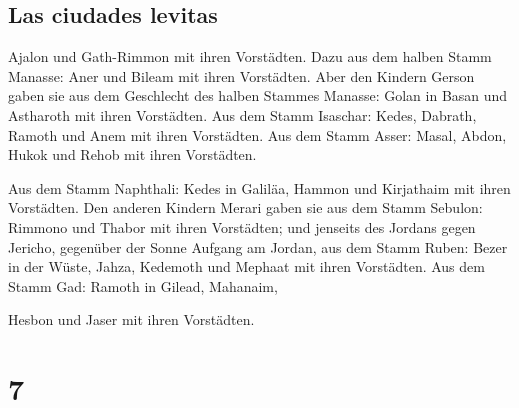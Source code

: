 \hypertarget{las-ciudades-levitas}{%
\subsection{Las ciudades levitas}\label{las-ciudades-levitas}}

 Ajalon und Gath-Rimmon mit ihren Vorstädten.
 Dazu aus dem halben Stamm Manasse: Aner und Bileam mit
ihren Vorstädten.  Aber den Kindern Gerson gaben sie aus
dem Geschlecht des halben Stammes Manasse: Golan in Basan und Astharoth
mit ihren Vorstädten.  Aus dem Stamm Isaschar: Kedes,
Dabrath,  Ramoth und Anem mit ihren Vorstädten.
 Aus dem Stamm Asser: Masal, Abdon,  Hukok
und Rehob mit ihren Vorstädten.

 Aus dem Stamm Naphthali: Kedes in Galiläa, Hammon und
Kirjathaim mit ihren Vorstädten.  Den anderen Kindern
Merari gaben sie aus dem Stamm Sebulon: Rimmono und Thabor mit ihren
Vorstädten;  und jenseits des Jordans gegen Jericho,
gegenüber der Sonne Aufgang am Jordan, aus dem Stamm Ruben: Bezer in der
Wüste, Jahza,  Kedemoth und Mephaat mit ihren Vorstädten.
 Aus dem Stamm Gad: Ramoth in Gilead, Mahanaim,

 Hesbon und Jaser mit ihren Vorstädten.

\hypertarget{section-6}{%
\section{7}\label{section-6}}

